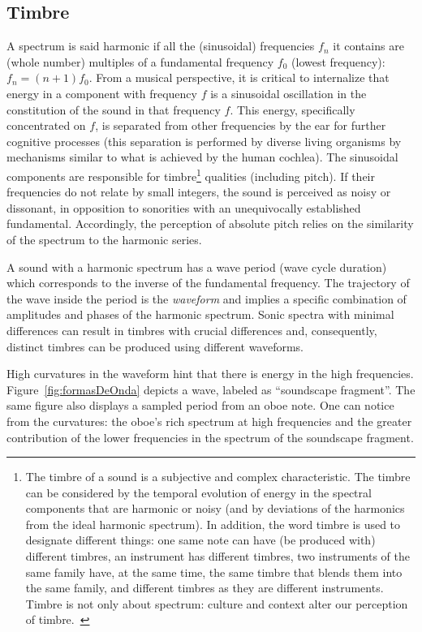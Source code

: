 \subsection{Timbre}\label{sec:timbre}
A spectrum is said harmonic if all the (sinusoidal) frequencies $f_n$ it contains are (whole number) multiples of a fundamental frequency $f_0$ (lowest frequency): $f_n=(n+1)f_0$.
From a musical perspective, it is critical to internalize that energy in a component with frequency $f$
is a sinusoidal oscillation in the constitution of the sound in that frequency $f$.
This energy, specifically concentrated on $f$,
is separated from other frequencies by the ear for further cognitive processes 
(this separation is performed by diverse living organisms by mechanisms similar to what is achieved by the human cochlea).
The sinusoidal components are responsible for timbre\footnote{The 
timbre of a sound is a subjective and complex characteristic.
The timbre can be considered by the temporal evolution of energy in the spectral components that 
are harmonic or noisy (and by deviations of the harmonics from the ideal harmonic spectrum).
In addition, the word timbre is used to designate different things:
one same note can have (be produced with) different timbres,
an instrument has different timbres, two instruments of the same family have,
at the same time, the same timbre that blends them into the same family,
and different timbres as they are different instruments.
Timbre is not only about spectrum: culture and context alter our perception of timbre.~\cite{Roederer}} qualities (including pitch).
If their frequencies do not relate by small integers, the sound is perceived as noisy or dissonant,
in opposition to sonorities with an unequivocally established fundamental.
Accordingly, the perception of absolute pitch relies on the similarity of the spectrum to the harmonic series.~\cite{Roederer}

A sound with a harmonic spectrum has a wave period (wave cycle duration) which corresponds to the inverse of the fundamental frequency.
The trajectory of the wave inside the period is the \emph{waveform} and implies a specific combination of amplitudes and phases of the harmonic spectrum.
Sonic spectra with minimal differences can result in timbres with crucial differences and,
consequently, distinct timbres can be produced using different waveforms.

High curvatures in the waveform hint that there is energy in the high frequencies.
Figure~\ref{fig:formasDeOnda} depicts a wave, labeled as ``soundscape fragment''.
The same figure also displays a sampled period from an oboe note.
One can notice from the curvatures: the oboe's rich spectrum at high frequencies and the greater contribution of the lower frequencies in the spectrum of the soundscape fragment.

